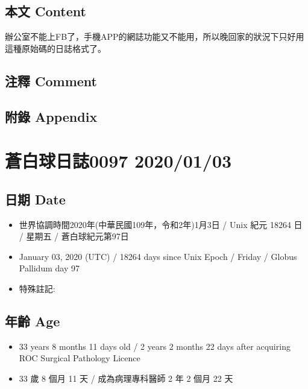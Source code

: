 \documentclass[a5paper, 12pt
]{book}
\providecommand{\tightlist}{%
  \setlength{\itemsep}{0pt}\setlength{\parskip}{0pt}}
\begin{document}
\hypertarget{ux672cux6587-content-32}{%
\subsection{本文 Content}\label{ux672cux6587-content-32}}

辦公室不能上FB了，手機APP的網誌功能又不能用，所以晚回家的狀況下只好用這種原始碼的日誌格式了。

\hypertarget{ux6ce8ux91cb-comment-31}{%
\subsection{注釋 Comment}\label{ux6ce8ux91cb-comment-31}}

\hypertarget{ux9644ux9304-appendix-32}{%
\subsection{附錄 Appendix}\label{ux9644ux9304-appendix-32}}

\hypertarget{ux84bcux767dux7403ux65e5ux8a8c0097-20200103}{%
\section{蒼白球日誌0097
2020/01/03}\label{ux84bcux767dux7403ux65e5ux8a8c0097-20200103}}

\hypertarget{ux65e5ux671f-date-33}{%
\subsection{日期 Date}\label{ux65e5ux671f-date-33}}

\begin{itemize}
\tightlist
\item
  世界協調時間2020年(中華民國109年，令和2年)1月3日 / Unix 紀元 18264 日
  / 星期五 / 蒼白球紀元第97日
\item
  January 03, 2020 (UTC) / 18264 days since Unix Epoch / Friday / Globus
  Pallidum day 97
\item
  特殊註記:
\end{itemize}

\hypertarget{ux5e74ux9f61-age-33}{%
\subsection{年齡 Age}\label{ux5e74ux9f61-age-33}}

\begin{itemize}
\tightlist
\item
  33 years 8 months 11 days old / 2 years 2 months 22 days after
  acquiring ROC Surgical Pathology Licence
\item
  33 歲 8 個月 11 天 / 成為病理專科醫師 2 年 2 個月 22 天
\end{itemize}
\end{document}
